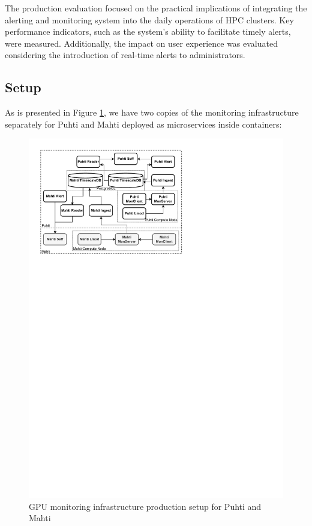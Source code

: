 
The production evaluation focused on the practical implications of integrating the alerting and monitoring system into the daily operations of HPC clusters. Key performance indicators, such as the system's ability to facilitate timely alerts, were measured. Additionally, the impact on user experience was evaluated considering the introduction of real-time alerts to administrators.

\subsection{Setup}

As is presented in Figure \ref{fig_monitoring_production_development}, we have two copies of the monitoring infrastructure separately for Puhti and Mahti deployed as microservices inside containers:

\begin{figure}[H]
    \centering
    \includegraphics[width=1\textwidth]{figures/production-deployment.pdf}
    \caption{GPU monitoring infrastructure production setup for Puhti and Mahti}
    \label{fig_monitoring_production_development}
\end{figure}

